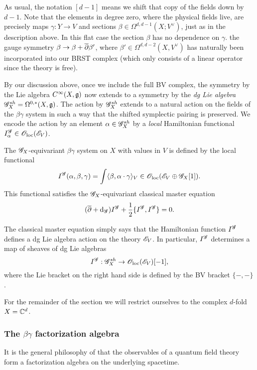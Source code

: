 \begin{rmk}
As usual, the notation $[d-1]$ means we shift that copy of the fields down by $d-1$. 
Note that the elements in degree zero, where the physical fields live, are precisely maps $\gamma : Y \to V$ and sections $\beta \in\Omega^{d,d-1} (X ; V^\vee)$, just as in the description above. 
In this flat case the section $\beta$ has no dependence on $\gamma$.
the gauge symmetry $\beta \to \beta + \overline{\partial} \beta'$, where $\beta' \in \Omega^{d,d-2} (X, V^\vee)$ has naturally been incorporated into our BRST complex (which only consists of a linear operator since the theory is free).
\end{rmk}

By our discussion above, once we include the full BV complex, the symmetry by the Lie algebra $C^\infty(X, \mathfrak g)$ now extends to a symmetry by the {\em dg Lie algebra} $\mathscr G_X^{sh} = \Omega^{0,*}(X, \mathfrak g)$. 
The action by $\mathscr G_X^{sh}$ extends to a natural action on the fields of the $\beta\gamma$ system in such a way that the shifted symplectic pairing is preserved. 
We encode the action by an element $\alpha \in \mathscr G_X^{sh}$ by a {\em local} Hamiltonian functional $I_\alpha^{\mathscr G} \in {\mathscr O}_{\rm loc}(\mathscr E_V)$. 

\begin{dfn/lem}
The $\mathscr G_X$-equivariant $\beta\gamma$ system on $X$ with values in $V$ is defined by the local functional
\[
I^{\mathscr G}(\alpha, \beta, \gamma) = \int \langle\beta, \alpha \cdot \gamma\rangle_V \in {\mathscr O}_{\rm loc}(\mathscr E_V \oplus \mathscr G_X[1]) .
\]
This functional satisfies the $\mathscr G_X$-equivariant classical master equation
\[
(\overline{\partial} + {\rm d}_{\mathscr G}) I^{\mathscr G} + \frac{1}{2} \{I^{\mathscr G}, I^{\mathscr G}\} = 0 .
\] 
\end{dfn/lem}

The classical master equation simply says that the Hamiltonian function $I^{\mathscr G}$ defines a dg Lie algebra action on the theory $\mathscr E_V$. 
In particular, $I^{\mathscr G}$ determines a map of sheaves of dg Lie algebras 
\[
I^{\mathscr G} : \mathscr G^{sh}_X \to {\mathscr O}_{\rm loc}(\mathscr E_V)[-1],
\] 
where the Lie bracket on the right hand side is defined by the BV bracket $\{-,-\}$. 

For the remainder of the section we will restrict ourselves to the complex $d$-fold $X = \mathbb C^d$. 

\subsubsection{The $\beta\gamma$ factorization algebra}

It is the general philosophy of \cite{CG1,CG2} that the observables of a quantum field theory form a factorization algebra on the underlying spacetime. 

